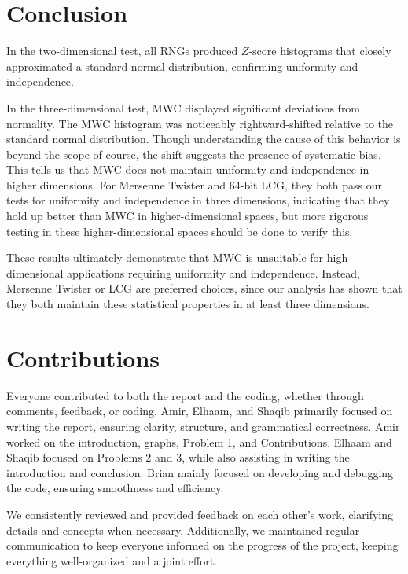 \documentclass{article}
\begin{document}
\section*{Conclusion}
\hspace{1.5em} In the two-dimensional test, all RNGs produced \(Z\text{-score}\) histograms that closely approximated a standard normal distribution, confirming uniformity and independence.

In the three-dimensional test, MWC displayed significant deviations from normality. The MWC histogram was noticeably rightward-shifted relative to the standard normal distribution. Though understanding the cause of this behavior is beyond the scope of course, the shift suggests the presence of systematic bias. This tells us that MWC does not maintain uniformity and independence in higher dimensions. For Mersenne Twister and 64-bit LCG, they both pass our tests for uniformity and independence in three dimensions, indicating that they hold up better than MWC in higher-dimensional spaces, but more rigorous testing in these higher-dimensional spaces should be done to verify this.

These results ultimately demonstrate that MWC is unsuitable for high-dimensional applications requiring uniformity and independence. Instead, Mersenne Twister or LCG are preferred choices, since our analysis has shown that they both maintain these statistical properties in at least three dimensions. 

\section*{Contributions}
\hspace{1.5em} Everyone contributed to both the report and the coding, whether through comments, feedback, or coding. Amir, Elhaam, and Shaqib primarily focused on writing the report, ensuring clarity, structure, and grammatical correctness. Amir worked on the introduction, graphs, Problem 1, and Contributions. Elhaam and Shaqib focused on Problems 2 and 3, while also assisting in writing the introduction and conclusion. Brian mainly focused on developing and debugging the code, ensuring smoothness and efficiency. 

We consistently reviewed and provided feedback on each other's work, clarifying details and concepts when necessary. Additionally, we maintained regular communication to keep everyone informed on the progress of the project, keeping everything well-organized and a joint effort.
\pagebreak
\end{document}
